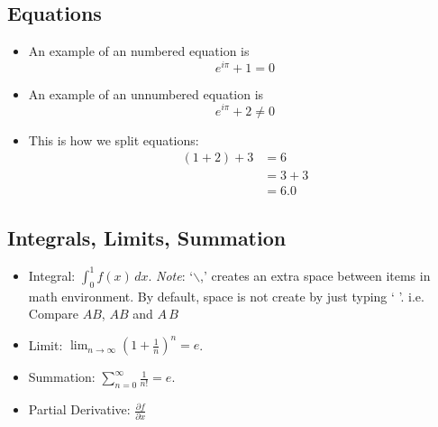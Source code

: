 \documentclass{article} %
\begin{document}
		\subsection{Equations}
			\begin{itemize}
				\item An example of an numbered equation is
				\begin{equation}
				 e^{i \pi}+1 =0
				\end{equation}
				\item An example of an unnumbered equation is
				\begin{equation*}
				e^{i \pi}+2 \not=0
				\end{equation*}
				\item This is how we split equations:
				\begin{equation}
					\begin{split}
					(1+2)+3 &=6\\
							&= 3+ 3\\
							&= 6.0
					\end{split}
				\end{equation}
			\end{itemize}
		\subsection{Integrals, Limits, Summation}
			\begin{itemize}
				\item Integral: $\int_{0}^{1} f(x) \, dx$. \emph{Note}: `$\backslash$,' creates an extra space between items in math environment. By default, space is not create by just typing ` '. i.e. Compare $A B$, $AB$ and $A \, B$
				\item Limit: $\lim_{n\to\infty}(1+\frac{1}{n})^{n} = e$.
				\item Summation: $\sum\limits_{n=0}^{\infty} \frac{1}{n!} = e$.
				\item Partial Derivative: $\frac{\partial f}{\partial x}$
			\end{itemize}
			
\end{document}
